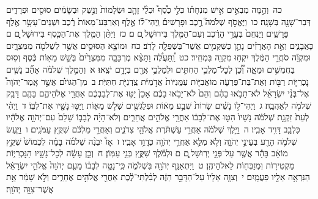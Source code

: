 \documentclass[18pt]{article}
\begin{document}
 {\loc כה~}וְהֵ֣מָּה מְבִאִ֣ים אִ֣ישׁ מִנְחָת֡וֹ כְּלֵ֣י כֶ֩סֶף֩ וּכְלֵ֨י זָהָ֤ב וּשְׂלָמוֹת֙ וְנֵ֣שֶׁק וּבְשָׂמִ֔ים סוּסִ֖ים וּפְרָדִ֑ים דְּבַר־שָׁנָ֖ה בְּשָׁנָֽה׃ \startlock
 {\loc כו~}וַיֶּאֱסֹ֣ף שְׁלֹמֹה֮ רֶ֣כֶב וּפָרָשִׁים֒ וַֽיְהִי־ל֗וֹ אֶ֤לֶף וְאַרְבַּע־מֵאוֹת֙ רֶ֔כֶב וּשְׁנֵים־עָשָׂ֥ר אֶ֖לֶף פָּרָשִׁ֑ים וַיַּנְחֵם֙ בְּעָרֵ֣י הָרֶ֔כֶב וְעִם־הַמֶּ֖לֶךְ בִּירוּשָׁל ָֽ͏ְם ם׃ \startlock
 {\loc כז~}וַיִּתֵּ֨ן הַמֶּ֧לֶךְ אֶת־הַכֶּ֛סֶף בִּירוּשָׁל ַ֖͏ְם ם כָּאֲבָנִ֑ים וְאֵ֣ת הָאֲרָזִ֗ים נָתַ֛ן כַּשִּׁקְמִ֥ים אֲשֶׁר־בַּשְּׁפֵלָ֖ה לָרֹֽב׃ \startlock
 {\loc כח~}וּמוֹצָ֧א הַסּוּסִ֛ים אֲשֶׁ֥ר לִשְׁלֹמֹ֖ה מִמִּצְרָ֑יִם וּמִקְוֵ֕ה סֹחֲרֵ֣י הַמֶּ֔לֶךְ יִקְח֥וּ מִקְוֵ֖ה בִּמְחִֽיר׃ \startlock
 {\loc כט~}וַֽ֠תַּעֲלֶ֠ה וַתֵּצֵ֨א מֶרְכָּבָ֤ה מִמִּצְרַ֙יִם֙ בְּשֵׁ֣שׁ מֵא֣וֹת כֶּ֔סֶף וְס֖וּס בַּחֲמִשִּׁ֣ים וּמֵאָ֑ה וְ֠כֵ֠ן לְכׇל־מַלְכֵ֧י הַחִתִּ֛ים וּלְמַלְכֵ֥י אֲרָ֖ם בְּיָדָ֥ם יֹצִֽאוּ׃ 
\startlock
 {\loc א~}וְהַמֶּ֣לֶךְ שְׁלֹמֹ֗ה אָהַ֞ב נָשִׁ֧ים נׇכְרִיּ֛וֹת רַבּ֖וֹת וְאֶת־בַּת־פַּרְעֹ֑ה מוֹאֲבִיּ֤וֹת עַמֳּנִיּוֹת֙ אֲדֹ֣מִיֹּ֔ת צֵֽדְנִיֹּ֖ת חִתִּיֹּֽת׃ \startlock
 {\loc ב~}מִן־הַגּוֹיִ֗ם אֲשֶׁ֣ר אָֽמַר־יְהֹוָה֩ אֶל־בְּנֵ֨י יִשְׂרָאֵ֜ל לֹא־תָבֹ֣אוּ בָהֶ֗ם וְהֵם֙ לֹא־יָבֹ֣אוּ בָכֶ֔ם אָכֵן֙ יַטּ֣וּ אֶת־לְבַבְכֶ֔ם אַחֲרֵ֖י אֱלֹהֵיהֶ֑ם בָּהֶ֛ם דָּבַ֥ק שְׁלֹמֹ֖ה לְאַהֲבָֽה׃ \startlock
 {\loc ג~}וַיְהִי־ל֣וֹ נָשִׁ֗ים שָׂרוֹת֙ שְׁבַ֣ע מֵא֔וֹת וּפִלַגְשִׁ֖ים שְׁלֹ֣שׁ מֵא֑וֹת וַיַּטּ֥וּ נָשָׁ֖יו אֶת־לִבּֽוֹ׃ \startlock
 {\loc ד~}וַיְהִ֗י לְעֵת֙ זִקְנַ֣ת שְׁלֹמֹ֔ה נָשָׁיו֙ הִטּ֣וּ אֶת־לְבָב֔וֹ אַחֲרֵ֖י אֱלֹהִ֣ים אֲחֵרִ֑ים וְלֹא־הָיָ֨ה לְבָב֤וֹ שָׁלֵם֙ עִם־יְהֹוָ֣ה אֱלֹהָ֔יו כִּלְבַ֖ב דָּוִ֥יד אָבִֽיו׃ \startlock
 {\loc ה~}וַיֵּ֣לֶךְ שְׁלֹמֹ֔ה אַחֲרֵ֣י עַשְׁתֹּ֔רֶת אֱלֹהֵ֖י צִדֹנִ֑ים וְאַחֲרֵ֣י מִלְכֹּ֔ם שִׁקֻּ֖ץ עַמֹּנִֽים׃ \startlock
 {\loc ו~}וַיַּ֧עַשׂ שְׁלֹמֹ֛ה הָרַ֖ע בְּעֵינֵ֣י יְהֹוָ֑ה וְלֹ֥א מִלֵּ֛א אַחֲרֵ֥י יְהֹוָ֖ה כְּדָוִ֥ד אָבִֽיו׃ \startlock
 {\loc ז~}אָז֩ יִבְנֶ֨ה שְׁלֹמֹ֜ה בָּמָ֗ה לִכְמוֹשׁ֙ שִׁקֻּ֣ץ מוֹאָ֔ב בָּהָ֕ר אֲשֶׁ֖ר עַל־פְּנֵ֣י יְרֽוּשָׁל ָ֑͏ְם ם וּלְמֹ֕לֶךְ שִׁקֻּ֖ץ בְּנֵ֥י עַמּֽוֹן׃ \startlock
 {\loc ח~}וְכֵ֣ן עָשָׂ֔ה לְכׇל־נָשָׁ֖יו הַנׇּכְרִיּ֑וֹת מַקְטִיר֥וֹת וּֽמְזַבְּח֖וֹת לֵאלֹהֵיהֶֽן׃ \startlock
 {\loc ט~}וַיִּתְאַנַּ֥ף יְהֹוָ֖ה בִּשְׁלֹמֹ֑ה כִּֽי־נָטָ֣ה לְבָב֗וֹ מֵעִ֤ם יְהֹוָה֙ אֱלֹהֵ֣י יִשְׂרָאֵ֔ל הַנִּרְאָ֥ה אֵלָ֖יו פַּעֲמָֽיִם׃ \startlock
 {\loc י~}וְצִוָּ֤ה אֵלָיו֙ עַל־הַדָּבָ֣ר הַזֶּ֔ה לְבִ֨לְתִּי־לֶ֔כֶת אַחֲרֵ֖י אֱלֹהִ֣ים אֲחֵרִ֑ים וְלֹ֣א שָׁמַ֔ר אֵ֥ת אֲשֶׁר־צִוָּ֖ה יְהֹוָֽה׃ \startlock
\end{document}
